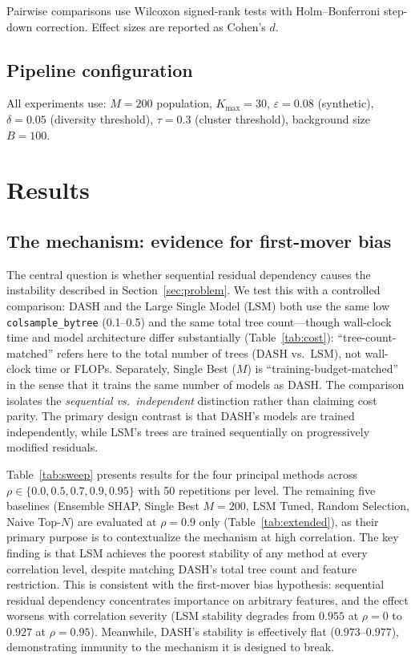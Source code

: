 \documentclass[11pt]{article}
\newcommand{\dash}{\textsc{DASH}}
\newcommand{\rhovar}{\rho}
\begin{document}
Pairwise comparisons use Wilcoxon signed-rank tests with Holm--Bonferroni
step-down correction. Effect sizes are reported as Cohen's $d$.

\subsection{Pipeline configuration}

All experiments use: $M = 200$ population, $K_{\max} = 30$,
$\varepsilon = 0.08$ (synthetic), $\delta = 0.05$ (diversity threshold),
$\tau = 0.3$ (cluster threshold), background size $B = 100$.


\section{Results}
\label{sec:results}

\subsection{The mechanism: evidence for first-mover bias}
\label{sec:mechanism_result}

The central question is whether sequential residual dependency causes
the instability described in Section~\ref{sec:problem}. We test this
with a controlled comparison: \dash{} and the Large Single Model (LSM)
both use the same low \texttt{colsample\_bytree} (0.1--0.5) and the same
total tree count---though wall-clock time and model architecture differ
substantially (Table~\ref{tab:cost}): ``tree-count-matched'' refers here to
the total number of trees (DASH vs.\ LSM), not wall-clock time or FLOPs.
Separately, Single Best ($M$) is ``training-budget-matched'' in the sense
that it trains the same number of models as DASH. The comparison isolates the
\emph{sequential vs.\ independent} distinction rather than claiming
cost parity. The primary design contrast is that \dash{}'s models
are trained independently, while LSM's trees are trained sequentially
on progressively modified residuals.

Table~\ref{tab:sweep} presents results for the four principal methods
across $\rhovar \in \{0.0, 0.5, 0.7, 0.9, 0.95\}$ with 50 repetitions per
level. The remaining five baselines (Ensemble SHAP, Single Best $M{=}200$,
LSM Tuned, Random Selection, Naive Top-$N$) are evaluated at
$\rhovar = 0.9$ only (Table~\ref{tab:extended}), as their primary
purpose is to contextualize the mechanism at high correlation. The key finding is that LSM achieves the poorest
stability of any method at every correlation level, despite matching
\dash{}'s total tree count and feature restriction. This is consistent
with the first-mover bias hypothesis: sequential residual dependency concentrates
importance on arbitrary features, and the effect worsens with
correlation severity (LSM stability degrades from $0.955$ at
$\rhovar = 0$ to $0.927$ at $\rhovar = 0.95$). Meanwhile, \dash{}'s
stability is effectively flat ($0.973$--$0.977$), demonstrating
immunity to the mechanism it is designed to break.
\end{document}
